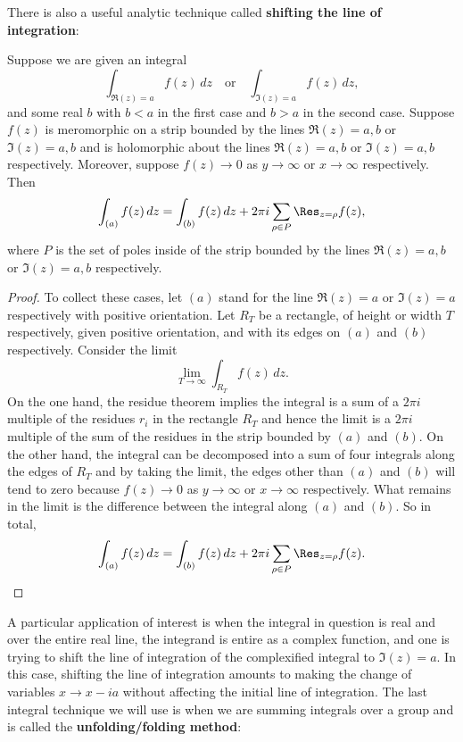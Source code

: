         There is also a useful analytic technique called \textbf{shifting the line of integration}:

        \begin{theorem}
          Suppose we are given an integral
          \[
            \int_{\Re(z) = a}f(z)\,dz \quad \text{or} \quad \int_{\Im(z) = a}f(z)\,dz,
          \]
          and some real $b$ with $b < a$ in the first case and $b > a$ in the second case. Suppose $f(z)$ is meromorphic on a strip bounded by the lines $\Re(z) = a,b$ or $\Im(z) = a,b$ and is holomorphic about the lines $\Re(z) = a,b$ or $\Im(z) = a,b$ respectively. Moreover, suppose $f(z) \to 0$ as $y \to \infty$ or $x \to \infty$ respectively. Then
          \[
            \int_{(a)}f(z)\,dz = \int_{(b)}f(z)\,dz+2\pi i\sum_{\rho \in P}\Res_{z = \rho}f(z),
          \]
          where $P$ is the set of poles inside of the strip bounded by the lines $\Re(z) = a,b$ or $\Im(z) = a,b$ respectively.
        \end{theorem}
        \begin{proof}
          To collect these cases, let $(a)$ stand for the line $\Re(z) = a$ or $\Im(z) = a$ respectively with positive orientation. Let $R_{T}$ be a rectangle, of height or width $T$ respectively, given positive orientation, and with its edges on $(a)$ and $(b)$ respectively. Consider the limit
          \[
            \lim_{T \to \infty}\int_{R_{T}}f(z)\,dz.
          \]
          On the one hand, the residue theorem implies the integral is a sum of a $2\pi i$ multiple of the residues $r_{i}$ in the rectangle $R_{T}$ and hence the limit is a $2\pi i$ multiple of the sum of the residues in the strip bounded by $(a)$ and $(b)$. On the other hand, the integral can be decomposed into a sum of four integrals along the edges of $R_{T}$ and by taking the limit, the edges other than $(a)$ and $(b)$ will tend to zero because $f(z) \to 0$ as $y \to \infty$ or $x \to \infty$ respectively. What remains in the limit is the difference between the integral along $(a)$ and $(b)$. So in total,
          \[
            \int_{(a)}f(z)\,dz = \int_{(b)}f(z)\,dz+2\pi i\sum_{\rho \in P}\Res_{z = \rho}f(z).
          \]
        \end{proof}

        A particular application of interest is when the integral in question is real and over the entire real line, the integrand is entire as a complex function, and one is trying to shift the line of integration of the complexified integral to $\Im(z) = a$. In this case, shifting the line of integration amounts to making the change of variables $x \to x-ia$ without affecting the initial line of integration. The last integral technique we will use is when we are summing integrals over a group and is called the \textbf{unfolding/folding method}:

